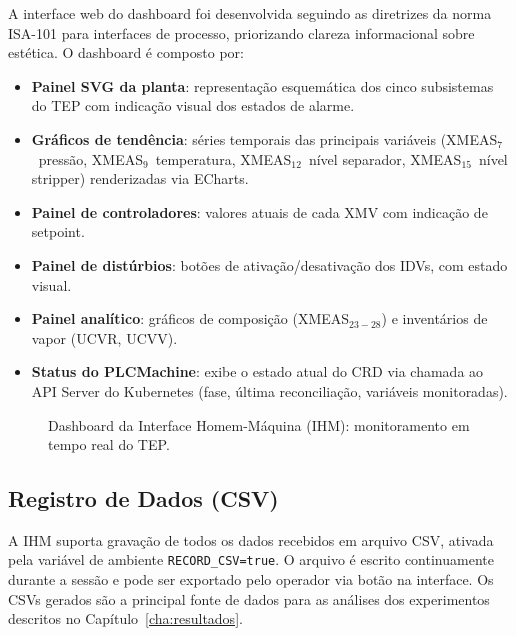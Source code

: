 A interface web do dashboard foi desenvolvida seguindo as diretrizes da norma ISA-101 para interfaces de processo, priorizando clareza informacional sobre estética. O dashboard é composto por:

\begin{itemize}
  \item \textbf{Painel SVG da planta}: representação esquemática dos cinco subsistemas do TEP com indicação visual dos estados de alarme.
  \item \textbf{Gráficos de tendência}: séries temporais das principais variáveis (XMEAS$_7$~pressão, XMEAS$_9$~temperatura, XMEAS$_{12}$~nível separador, XMEAS$_{15}$~nível stripper) renderizadas via ECharts.
  \item \textbf{Painel de controladores}: valores atuais de cada XMV com indicação de setpoint.
  \item \textbf{Painel de distúrbios}: botões de ativação/desativação dos IDVs, com estado visual.
  \item \textbf{Painel analítico}: gráficos de composição (XMEAS$_{23-28}$) e inventários de vapor (UCVR, UCVV).
  \item \textbf{Status do PLCMachine}: exibe o estado atual do CRD via chamada ao API Server do Kubernetes (fase, última reconciliação, variáveis monitoradas).
\end{itemize}

\begin{figure}[htbp]
\centering
{}
\caption{Dashboard da Interface Homem-Máquina (IHM): monitoramento em tempo real do TEP.}
\label{fig:ihm_dashboard}
\end{figure}

\subsection{Registro de Dados (CSV)}

A IHM suporta gravação de todos os dados recebidos em arquivo CSV, ativada pela variável de ambiente \texttt{RECORD\_CSV=true}. O arquivo é escrito continuamente durante a sessão e pode ser exportado pelo operador via botão na interface. Os CSVs gerados são a principal fonte de dados para as análises dos experimentos descritos no Capítulo~\ref{cha:resultados}.

